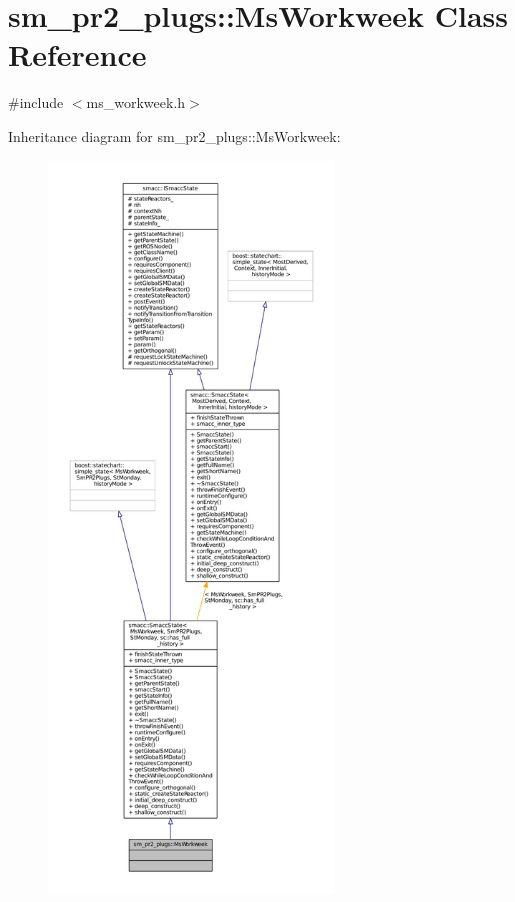\hypertarget{classsm__pr2__plugs_1_1MsWorkweek}{}\section{sm\+\_\+pr2\+\_\+plugs\+:\+:Ms\+Workweek Class Reference}
\label{classsm__pr2__plugs_1_1MsWorkweek}


{\ttfamily \#include $<$ms\+\_\+workweek.\+h$>$}



Inheritance diagram for sm\+\_\+pr2\+\_\+plugs\+:\+:Ms\+Workweek\+:
\nopagebreak
\begin{figure}[H]
\begin{center}
\leavevmode
\includegraphics[height=550pt]{classsm__pr2__plugs_1_1MsWorkweek__inherit__graph}
\end{center}
\end{figure}


